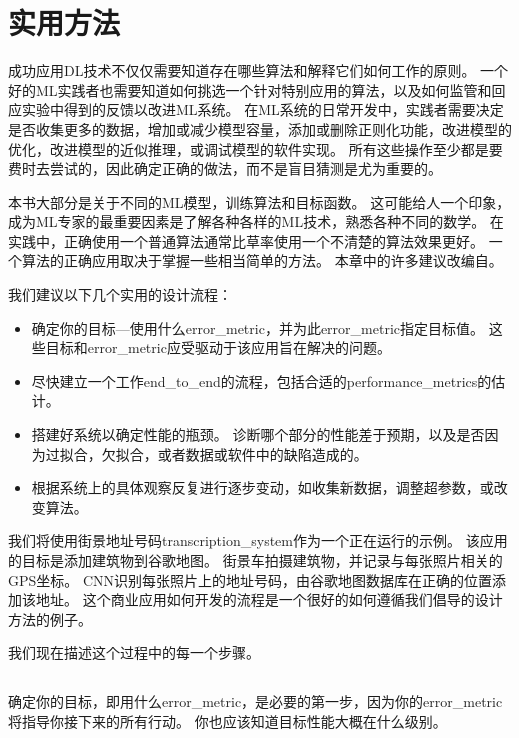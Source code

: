 \chapter{实用方法}
\label{chap:practical_methodology}
成功应用\gls{DL}技术不仅仅需要知道存在哪些算法和解释它们如何工作的原则。
一个好的\gls{ML}实践者也需要知道如何挑选一个针对特别应用的算法，以及如何监管和回应实验中得到的反馈以改进\gls{ML}系统。
在\gls{ML}系统的日常开发中，实践者需要决定是否收集更多的数据，增加或减少模型容量，添加或删除正则化功能，改进模型的优化，改进模型的近似推理，或调试模型的软件实现。
所有这些操作至少都是要费时去尝试的，因此确定正确的做法，而不是盲目猜测是尤为重要的。

本书大部分是关于不同的\gls{ML}模型，训练算法和目标函数。
这可能给人一个印象，成为\gls{ML}专家的最重要因素是了解各种各样的\gls{ML}技术，熟悉各种不同的数学。
在实践中，正确使用一个普通算法通常比草率使用一个不清楚的算法效果更好。
一个算法的正确应用取决于掌握一些相当简单的方法。
本章中的许多建议改编自\cite{ng-lecture-advice}。

我们建议以下几个实用的设计流程：
\begin{itemize}
\item 确定你的目标---使用什么\gls{error_metric}，并为此\gls{error_metric}指定目标值。
这些目标和\gls{error_metric}应受驱动于该应用旨在解决的问题。


\item 尽快建立一个工作\gls{end_to_end}的流程，包括合适的\gls{performance_metrics}的估计。

\item 搭建好系统以确定性能的瓶颈。
诊断哪个部分的性能差于预期，以及是否因为过拟合，欠拟合，或者数据或软件中的缺陷造成的。

\item 根据系统上的具体观察反复进行逐步变动，如收集新数据，调整超参数，或改变算法。
\end{itemize}

我们将使用街景地址号码\gls{transcription_system}\citep{Goodfellow+et+al-ICLR2014a}作为一个正在运行的示例。
该应用的目标是添加建筑物到谷歌地图。
街景车拍摄建筑物，并记录与每张照片相关的GPS坐标。
\gls{CNN}识别每张照片上的地址号码，由谷歌地图数据库在正确的位置添加该地址。
这个商业应用如何开发的流程是一个很好的如何遵循我们倡导的设计方法的例子。

我们现在描述这个过程中的每一个步骤。

\section{}
\label{sec:performance_metrics}
确定你的目标，即用什么\gls{error_metric}，是必要的第一步，因为你的\gls{error_metric}将指导你接下来的所有行动。
你也应该知道目标性能大概在什么级别。

